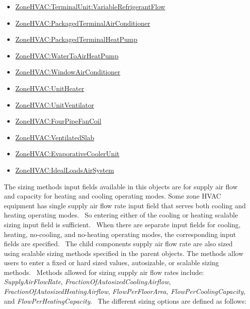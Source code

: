 \begin{itemize}
\item
  \hyperref[zonehvacterminalunitvariablerefrigerantflow]{ZoneHVAC:TerminalUnit:VariableRefrigerantFlow}
\item
  \hyperref[zonehvacpackagedterminalairconditioner]{ZoneHVAC:PackagedTerminalAirConditioner}
\item
  \hyperref[zonehvacpackagedterminalheatpump]{ZoneHVAC:PackagedTerminalHeatPump}
\item
  \hyperref[zonehvacwatertoairheatpump]{ZoneHVAC:WaterToAirHeatPump}
\item
  \hyperref[zonehvacwindowairconditioner]{ZoneHVAC:WindowAirConditioner}
\item
  \hyperref[zonehvacunitheater]{ZoneHVAC:UnitHeater}
\item
  \hyperref[zonehvacunitventilator]{ZoneHVAC:UnitVentilator}
\item
  \hyperref[zonehvacfourpipefancoil]{ZoneHVAC:FourPipeFanCoil}
\item
  \hyperref[zonehvacventilatedslab]{ZoneHVAC:VentilatedSlab}
\item
  \hyperref[zonehvacevaporativecoolerunit]{ZoneHVAC:EvaporativeCoolerUnit}
\item
  \hyperref[zonehvacidealloadsairsystem]{ZoneHVAC:IdealLoadsAirSystem}
\end{itemize}

The sizing methods input fields available in this objects are for supply air flow and capacity for heating and cooling operating modes. Some zone HVAC equipment has single supply air flow rate input field that serves both cooling and heating operating modes.~ So entering either of the cooling or heating scalable sizing input field is sufficient.~ When there are separate input fields for cooling, heating, no-cooling, and no-heating operating modes, the corresponding input fields are specified.~ The child components supply air flow rate are also sized using scalable sizing methods specified in the parent objects. The methods allow users to enter a fixed or hard sized values, autosizable, or scalable sizing methods.~ Methods allowed for sizing supply air flow rates include: \emph{SupplyAirFlowRate}, \emph{FractionOfAutosizedCoolingAirflow}, \emph{FractionOfAutosizedHeatingAirflow}, \emph{FlowPerFloorArea, FlowPerCoolingCapacity}, and \emph{FlowPerHeatingCapacity}.~ The different sizing options are defined as follows:

